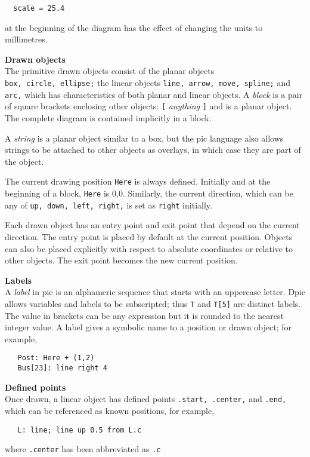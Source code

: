 {\tt \ \ scale\ =\ 25.4}

at the beginning of the diagram has the effect of changing
the units to millimetres.
%
\par\hskip-2pc{\bf Drawn objects}\\
The primitive drawn objects consist of the planar objects
{\tt box,\ circle,\ ellipse;}
the linear objects
{\tt line,\ arrow,\ move,\ spline;}
and
{\tt arc,}
which has characteristics of both planar and linear objects.
A
{\it block}
is a pair of square brackets enclosing other objects:
{\tt [}
{\it anything}
{\tt ]}
and is a planar object.
The complete diagram is contained implicitly in a block.

A
{\it string}
is a planar object similar to a box,
but the
pic
language also allows strings to be attached to other objects as overlays,
in which case they are part of the object.

The current drawing position
{\tt Here}
is always defined. 
Initially and at the beginning of a block,
{\tt Here}
is 0,0.
Similarly, the current direction, which can be any of
{\tt up,\ down,\ left,\ right,}
is set as
{\tt right}
initially.

Each drawn object has an entry point and exit point that depend
on the current direction.
The entry point is placed by default at the current position. 
Objects can also be placed explicitly with respect to absolute
coordinates or relative to other objects.
The exit point becomes the new current position.
\par\hskip-2pc{\bf Labels}\\
A
{\it label}
in
pic
is an alphameric sequence that starts with an uppercase letter.
Dpic allows variables and labels to be subscripted; thus
{\tt T}
and
{\tt T[5]}
are distinct labels.
The value in brackets can be any expression
but it is rounded to the nearest integer value.
A label gives a symbolic name to a position or drawn object;
for example,

{\tt \ \ \ Post:\ Here\ +\ (1,2)}
\\\hbox{}\hskip-1pt
{\tt \ \ \ Bus[23]:\ line\ right\ 4}
\par\hskip-2pc{\bf Defined points}\\
Once drawn, a linear object has defined points
{\tt .start,\ .center,}
and
{\tt .end,}
which can be referenced as known positions, for example,

{\tt \ \ \ L:\ line;\ line\ up\ 0.5\ from\ L.c}

where
{\tt .center}
has been abbreviated as
{\tt .c}

